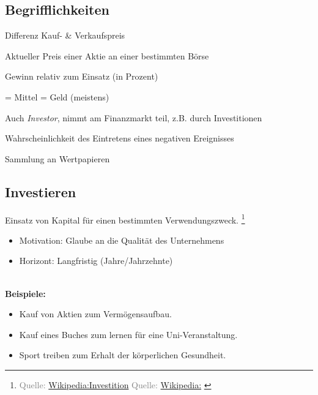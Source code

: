 \documentclass{beamer}
\newcommand{\n}{\hfill\\\vspace{0.25cm}}
\let\oldfootnote\footnote
\renewcommand{\footnote}[1]
{%
	\oldfootnote
	{
		\tiny
		\textcolor{gray}{#1}
	}%
}
\newcommand{\citewiki}[2][]
{%
	\footnote
	{
		\ifthenelse{\isempty{#1}}
		{
			Quelle: \href{https://de.wikipedia.org/wiki/#2}{Wikipedia:#2}
		}
		{
			Quelle: \href{https://de.wikipedia.org/wiki/#2}{Wikipedia:#1}
		}
	}
}
\begin{document}
		\begin{frame}
		\end{frame}
	
		\subsection{Begrifflichkeiten}
		
		\begin{frame}
			\begin{description}[labelwidth=0cm]
				\item[Gewinn/Verlust] Differenz Kauf- \& Verkaufspreis\pause
				\item[Kurs] Aktueller Preis einer Aktie an einer bestimmten Börse\pause
				\item[Rendite] Gewinn relativ zum Einsatz (in Prozent)\pause
				\item[Kapital] = Mittel = Geld (meistens)\pause
				\item[Anleger] Auch \textit{Investor}, nimmt am Finanzmarkt teil, z.B. durch Investitionen\pause
				\item[Risiko] Wahrscheinlichkeit des Eintretens eines negativen Ereignisses\pause
				\item[Portfolio] Sammlung an Wertpapieren
			\end{description}
		\end{frame}
		
		\subsection{Investieren}
		
			\begin{frame}
				\begin{definition}
					Einsatz von Kapital für einen bestimmten Verwendungszweck.\citewiki{Investition}
				\end{definition}
				\begin{itemize}
					\item Motivation: Glaube an die Qualität des Unternehmens
					\item Horizont: Langfristig (Jahre/Jahrzehnte)
				\end{itemize}\n
				\textbf{Beispiele:}
				\begin{itemize}
					\item Kauf von Aktien zum Vermögensaufbau.
					\item Kauf eines Buches zum lernen für eine Uni-Veranstaltung.
					\item Sport treiben zum Erhalt der körperlichen Gesundheit.
				\end{itemize}
			\end{frame}
		
\end{document}
